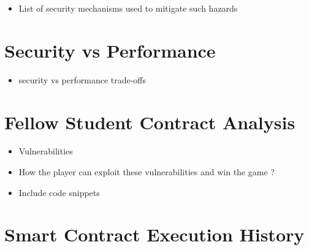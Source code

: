 \documentclass[12pt,a4paper]{article}
\begin{document}
\begin{itemize}
        \item List of security mechanisms used to mitigate such hazards
\end{itemize}

\section*{Security vs Performance}
\begin{itemize}
        \item security vs performance trade-offs
\end{itemize}

\section*{Fellow Student Contract Analysis}
\begin{itemize}
        \item Vulnerabilities
        \item How the player can exploit these vulnerabilities and win the game ?
        \item Include code snippets
\end{itemize}

\section*{Smart Contract Execution History}
\end{document}
